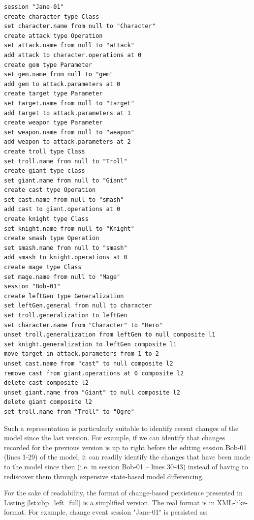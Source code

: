 \vspace{-20pt}
\begin{lstlisting}[style=eol,escapechar=|,caption={The complete version of Bob's change events.},label=lst:cbp_left_full]
session "Jane-01"
create character type Class
set character.name from null to "Character" 
create attack type Operation
set attack.name from null to "attack" 
add attack to character.operations at 0
create gem type Parameter
set gem.name from null to "gem" 
add gem to attack.parameters at 0
create target type Parameter
set target.name from null to "target" 
add target to attack.parameters at 1
create weapon type Parameter
set weapon.name from null to "weapon" 
add weapon to attack.parameters at 2
create troll type Class
set troll.name from null to "Troll" 
create giant type class
set giant.name from null to "Giant"
create cast type Operation
set cast.name from null to "smash"
add cast to giant.operations at 0
create knight type Class
set knight.name from null to "Knight"
create smash type Operation
set smash.name from null to "smash"
add smash to knight.operations at 0
create mage type Class
set mage.name from null to "Mage" 
session "Bob-01"
create leftGen type Generalization
set leftGen.general from null to character
set troll.generalization to leftGen
set character.name from "Character" to "Hero"
unset troll.generalization from leftGen to null composite l1
set knight.generalization to leftGen composite l1
move target in attack.parameters from 1 to 2
unset cast.name from "cast" to null composite l2
remove cast from giant.operations at 0 composite l2
delete cast composite l2
unset giant.name from "Giant" to null composite l2
delete giant composite l2
set troll.name from "Troll" to "Ogre"
\end{lstlisting}

Such a representation is particularly suitable to identify recent changes of the model since the last version. For example, if we can identify that changes recorded for the previous version is up to right before the editing session \textsf{Bob-01} (lines 1-29) of the model, it can readily identify the changes that have been made to the model since then (i.e. in session \textsf{Bob-01} -- lines 30-43) instead of having to rediscover them through expensive state-based model differencing.

For the sake of readability, the format of change-based persistence presented in Listing \ref{lst:cbp_left_full} is a simplified version. The real format is in XML-like-format. For example, change event \textsf{session "Jane-01"} is persisted as:


